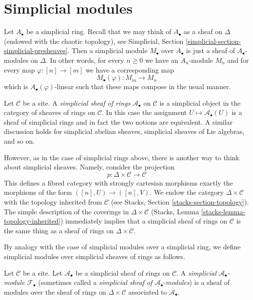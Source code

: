 \section{Simplicial modules}
\label{section-simplicial-modules}

\noindent
Let $A_\bullet$ be a simplicial ring. Recall that we may think of $A_\bullet$
as a sheaf on $\Delta$ (endowed with the chaotic topology), see
Simplicial, Section \ref{simplicial-section-simplicial-presheaves}.
Then a simplicial module $M_\bullet$ over $A_\bullet$ is just a sheaf of
$A_\bullet$-modules on $\Delta$. In other words, for every $n \geq 0$ we have
an $A_n$-module $M_n$ and for every map $\varphi : [n] \to [m]$ we have
a corresponding map
$$
M_\bullet(\varphi) : M_m \longrightarrow M_n
$$
which is $A_\bullet(\varphi)$-linear such that these maps compose in the
usual manner.

\medskip\noindent
Let $\mathcal{C}$ be a site. A {\it simplicial sheaf of rings}
$\mathcal{A}_\bullet$ on $\mathcal{C}$
is a simplicial object in the category of sheaves of rings on $\mathcal{C}$.
In this case the assignment $U \mapsto \mathcal{A}_\bullet(U)$ is a sheaf
of simplicial rings and in fact the two notions are equivalent.
A similar discussion holds for simplicial abelian sheaves, simplicial
sheaves of Lie algebras, and so on.

\medskip\noindent
However, as in the case of simplicial rings above, there is another way
to think about simplicial sheaves. Namely, consider the projection
$$
p : \Delta \times \mathcal{C} \longrightarrow \mathcal{C}
$$
This defines a fibred category with strongly cartesian morphisms
exactly the morphisms of the form $([n], U) \to ([n], V)$. We endow the category
$\Delta \times \mathcal{C}$ with the topology inherited from $\mathcal{C}$
(see Stacks, Section \ref{stacks-section-topology}). The simple description
of the coverings in $\Delta \times \mathcal{C}$
(Stacks, Lemma \ref{stacks-lemma-topology-inherited}) immediately
implies that a simplicial sheaf of rings on $\mathcal{C}$ is the
same thing as a sheaf of rings on $\Delta \times \mathcal{C}$.

\medskip\noindent
By analogy with the case of simplicial modules over a simplicial
ring, we define simplicial modules over simplicial sheaves of rings
as follows.

\begin{definition}
\label{definition-simplicial-module}
Let $\mathcal{C}$ be a site. Let $\mathcal{A}_\bullet$ be a simplicial
sheaf of rings on $\mathcal{C}$. A
{\it simplicial $\mathcal{A}_\bullet$-module} $\mathcal{F}_\bullet$
(sometimes called a
{\it simplicial sheaf of $\mathcal{A}_\bullet$-modules})
is a sheaf of modules over the sheaf of rings on $\Delta \times \mathcal{C}$
associated to $\mathcal{A}_\bullet$.
\end{definition}

